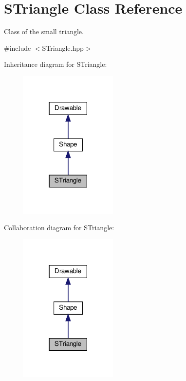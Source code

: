 \hypertarget{classSTriangle}{}\section{S\+Triangle Class Reference}
\label{classSTriangle}


Class of the small triangle.  




{\ttfamily \#include $<$S\+Triangle.\+hpp$>$}



Inheritance diagram for S\+Triangle\+:
\nopagebreak
\begin{figure}[H]
\begin{center}
\leavevmode
\includegraphics[width=138pt]{classSTriangle__inherit__graph}
\end{center}
\end{figure}


Collaboration diagram for S\+Triangle\+:
\nopagebreak
\begin{figure}[H]
\begin{center}
\leavevmode
\includegraphics[width=138pt]{classSTriangle__coll__graph}
\end{center}
\end{figure}
